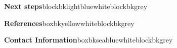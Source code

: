 \documentclass{beamer}
\begin{document}
\begin{frame}[t]
\begin{columns}[T]
\begin{column}{.46\textwidth}
				
				\begin{customblock}{\textbf{Next steps}}{blockbklightblue}{white}{blockbkgrey}
					
				\end{customblock}
			
				\begin{customblock}{\textbf{References}}{boxbkyellow}{white}{blockbkgrey}
					
				\end{customblock}
			
				\begin{customblock}{\textbf{Contact Information}}{boxbkseablue}{white}{blockbkgrey}
				
				\end{customblock}
			
			\end{column}
			
		\end{columns}

	\end{frame}
\end{document}
